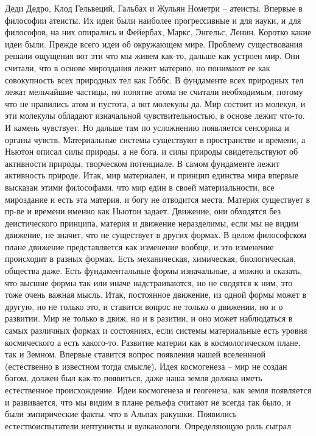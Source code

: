 \documentclass[a4paper, 12pt]{article}
\begin{document}
Деди Дедро, Клод Гельвеций, Гальбах и Жульян Нометри -- атеисты. Впервые 
в философии атеисты. Их идеи были наиболее прогрессивные и для науки, 
и для философов, на них опирались и Фейербах, Маркс, Энгельс, Ленин. 
Коротко какие идеи были. Прежде всего идеи об окружающем мире. Проблему 
существования решали ощущения вот эти что мы живем как-то, дальше как 
устроен мир. Они считали, что в основе мироздания лежит материю, но 
понимают ее как совокупность всех природных тел как Гоббс. В фундаменте 
всех природных тел лежат мельчайшие частицы, но понятие атома не считали 
необходимым, потому что не нравились атом и пустота, а вот молекулы да. 
Мир состоит из молекул, и эти молекулы обладают изначальной 
чувствительностью, в основе лежит что-то. И камень чувствует. Но дальше 
там по усложнению появляется сенсорика и органы чувств. Материальные 
системы существуют в пространстве и времени, а Ньютон описал силы 
природы, а не бога, и силы природы свидетельствуют об активности 
природы, творческом потенциале. В самом фундаменте лежит активность 
природе. Итак, мир материален, и принцип единства мира впервые высказан 
этими философами, что мир един в своей материальности, все мироздание 
и есть эта материя, и богу не отводится места. Материя существует 
в пр-ве и времени именно как Ньютон задает. Движение, они обходятся без 
деистического принципа, материя и движение неразделимы, если мы не видим 
движение, не значит, что не существует в других формах. В целом 
философском плане движение представляется как изменение вообще, и это 
изменение происходит в разных формах. Есть механическая, химическая, 
биологическая, общества даже. Есть фундаментальные формы изначальные, 
а можно и сказать, что высшие формы так или иначе надстраиваются, но не 
сводятся к ним, это тоже очень важная мысль. Итак, постоянное движение, 
из одной формы может в другую, но не только это, и ставится вопрос не 
только о движении, но и о развитии. Мир не только в движ, но 
и в разитии, и оно может наблюдаться в самых различных формах 
и состояниях, если системы материальные есть уровня космического а есть 
какого-то. Развитие материи как в космологическом плане, так и Земном. 
Впервые ставится вопрос появления нашей вселеннной (естественно 
в известном тогда смысле). Идея космогенеза -- мир не создан богом, 
должен был как-то появиться, даже наша земля должна иметь естественное 
происхождение. Идеи космогенеза и геогенеза, как земля появляется 
и развивается, что мы видим в плане рельефа считают не всегда так было, 
и были эмпирические факты, что в Альпах ракушки. Появились 
естествоиспытатели нептунисты и вулканологи. Определяющую роль сыграл 
\end{document}
